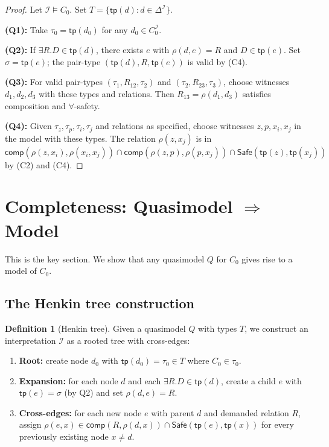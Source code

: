 \documentclass[a4paper,11pt]{article}
\theoremstyle{definition}
\newtheorem{definition}[theorem]{Definition}
\newcommand{\DeltaI}{\ensuremath{\Delta^{\mathcal{I}}}}
\newcommand{\interp}{\ensuremath{\mathcal{I}}}
\newcommand{\comp}{\ensuremath{\mathsf{comp}}}
\newcommand{\tp}{\ensuremath{\mathsf{tp}}}
\newcommand{\Safe}{\ensuremath{\mathsf{Safe}}}
\begin{document}
\begin{proof}
Let $\interp \models C_0$.  Set $T = \{\tp(d) : d \in \DeltaI\}$.

\textbf{(Q1):}\; Take $\tau_0 = \tp(d_0)$ for any $d_0 \in C_0^\interp$.

\textbf{(Q2):}\; If $\exists R.D \in \tp(d)$, there exists $e$
with $\rho(d,e) = R$ and $D \in \tp(e)$.  Set $\sigma = \tp(e)$;
the pair-type $(\tp(d), R, \tp(e))$ is valid by (C4).

\textbf{(Q3):}\; For valid pair-types $(\tau_1, R_{12}, \tau_2)$
and $(\tau_2, R_{23}, \tau_3)$, choose witnesses $d_1, d_2, d_3$
with these types and relations.  Then
$R_{13} = \rho(d_1, d_3)$ satisfies composition and $\forall$-safety.

\textbf{(Q4):}\; Given $\tau_z, \tau_p, \tau_i, \tau_j$ and
relations as specified, choose witnesses $z, p, x_i, x_j$ in the
model with these types.  The relation $\rho(z, x_j)$ is in
$\comp(\rho(z, x_i), \rho(x_i, x_j)) \cap
 \comp(\rho(z, p), \rho(p, x_j)) \cap
 \Safe(\tp(z), \tp(x_j))$
by (C2) and (C4).
\end{proof}


\section{Completeness: Quasimodel $\Rightarrow$ Model}
\label{sec:completeness}

This is the key section.  We show that any quasimodel $Q$ for
$C_0$ gives rise to a model of $C_0$.

\subsection{The Henkin tree construction}

\begin{definition}[Henkin tree]
\label{def:henkin}
Given a quasimodel $Q$ with types $T$, we construct an
interpretation $\interp$ as a rooted tree with cross-edges:
\begin{enumerate}[nosep]
  \item \textbf{Root:}\; create node $d_0$ with
    $\tp(d_0) = \tau_0 \in T$ where $C_0 \in \tau_0$.
  \item \textbf{Expansion:}\; for each node $d$ and each
    $\exists R.D \in \tp(d)$, create a child $e$ with
    $\tp(e) = \sigma$ (by Q2) and set $\rho(d, e) = R$.
  \item \textbf{Cross-edges:}\; for each new node $e$ with
    parent $d$ and demanded relation $R$, assign
    $\rho(e, x) \in \comp(R, \rho(d, x)) \cap
    \Safe(\tp(e), \tp(x))$
    for every previously existing node $x \neq d$.
\end{enumerate}
\end{definition}
\end{document}
